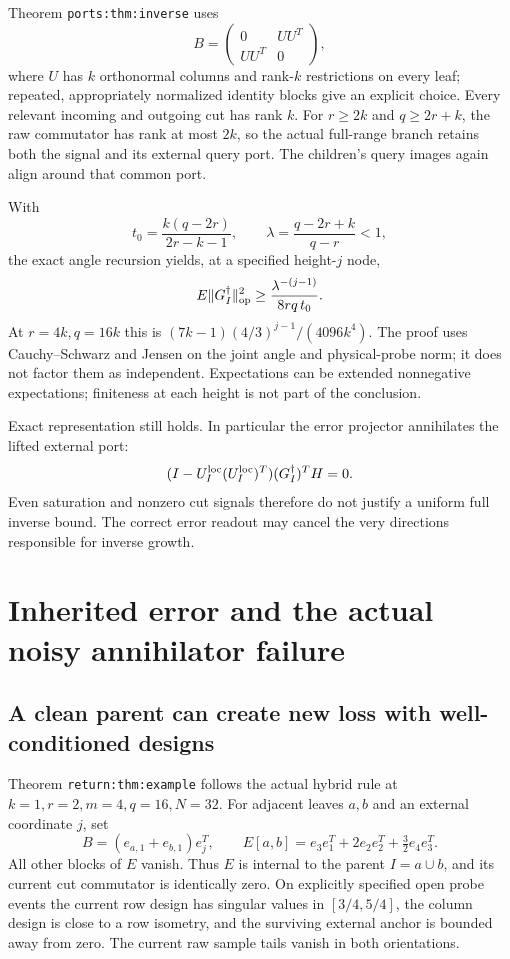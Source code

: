 \documentclass[11pt,oneside,openany,a4paper]{report}
\numberwithin{equation}{chapter}
\theoremstyle{definition}
\theoremstyle{remark}
\begin{document}
Theorem \texttt{ports:thm:inverse} uses
\[
 B=\begin{pmatrix}0&UU^T\\UU^T&0\end{pmatrix},
\]
where $U$ has $k$ orthonormal columns and rank-$k$ restrictions on
every leaf; repeated, appropriately normalized identity blocks give
an explicit choice.  Every relevant incoming and outgoing cut has
rank $k$.  For $r\ge2k$ and $q\ge2r+k$, the raw commutator has
rank at most $2k$, so the actual full-range branch retains both the
signal and its external query port.  The children's query images
again align around that common port.

With
\[
 t_0=\frac{k(q-2r)}{2r-k-1},\qquad
 \lambda=\frac{q-2r+k}{q-r}<1,
\]
the exact angle recursion yields, at a specified height-$j$ node,
\[
 \mathbb E\|G_I^\dagger\|_{\rm op}^2
 \ge\frac{\lambda^{-(j-1)}}{8rq\,t_0}.
\]
At $r=4k,q=16k$ this is
$(7k-1)(4/3)^{j-1}/(4096k^4)$.  The proof uses
Cauchy--Schwarz and Jensen on the joint angle and physical-probe
norm; it does not factor them as independent.  Expectations can be
extended nonnegative expectations; finiteness at each height is not
part of the conclusion.

Exact representation still holds.  In particular the error
projector annihilates the lifted external port:
\[
 (I-U_I^{\rm loc}(U_I^{\rm loc})^T)(G_I^\dagger)^TH=0.
\]
Even saturation and nonzero cut signals therefore do not justify a
uniform full inverse bound.  The correct error readout may cancel
the very directions responsible for inverse growth.

\section{Inherited error and the actual noisy annihilator failure}
\label{origobs:annihilator-failure}

\subsection{A clean parent can create new loss with well-conditioned designs}

Theorem \texttt{return:thm:example} follows the actual hybrid rule
at $k=1,r=2,m=4,q=16,N=32$.  For adjacent leaves $a,b$ and an
external coordinate $j$, set
\[
 B=(e_{a,1}+e_{b,1})e_j^T,\qquad
 E[a,b]=e_3e_1^T+2e_2e_2^T+\tfrac32e_4e_3^T.
\]
All other blocks of $E$ vanish.  Thus $E$ is internal to the parent
$I=a\cup b$, and its current cut commutator is identically zero.
On explicitly specified open probe events the current row design
has singular values in $[3/4,5/4]$, the column design is close to a
row isometry, and the surviving external anchor is bounded away
from zero.  The current raw sample tails vanish in both orientations.
\end{document}
